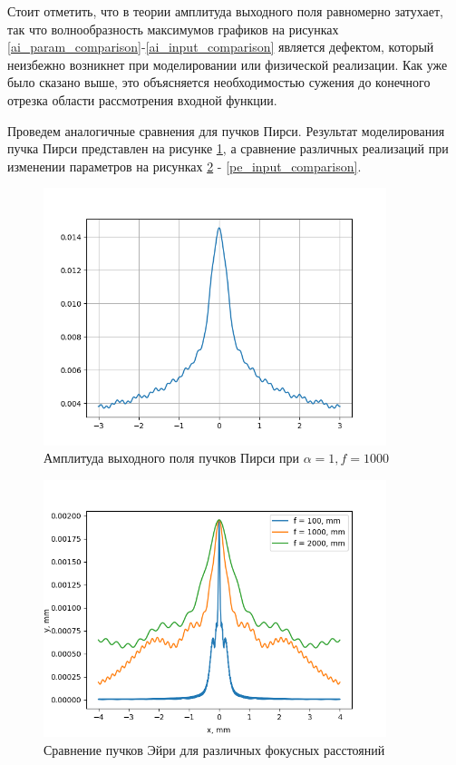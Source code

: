 {	Стоит отметить, что в теории амплитуда выходного поля
равномерно затухает, так что волнообразность максимумов графиков на рисунках
\ref{ai_param_comparison}-\ref{ai_input_comparison} является дефектом, который неизбежно возникнет при моделировании или физической реализации. Как уже было сказано выше, это
объясняется необходимостью сужения до конечного отрезка области
рассмотрения входной функции.

	Проведем аналогичные сравнения для пучков Пирси. Результат моделирования пучка Пирси представлен на рисунке \ref{pearceyoutput3}, а сравнение различных реализаций при изменении параметров на рисунках \ref{pe_focus_comparison} - \ref{pe_input_comparison}.

\begin{figure}[H]
		  \begin{center}
			\includegraphics[width=10cm]{plots/pearceyoutput3}
	\caption{Амплитуда выходного поля пучков Пирси при $ \alpha  = 1, f = 1000$}
	\label{pearceyoutput3}
		 \end{center}
\end{figure}

 \begin{figure}[H]
		  \begin{center}
			\includegraphics[width=10cm]{plots/pe_focus_comparison}
	\caption{Сравнение пучков Эйри для различных фокусных расстояний}
	\label{pe_focus_comparison}
		 \end{center}
\end{figure}

}
